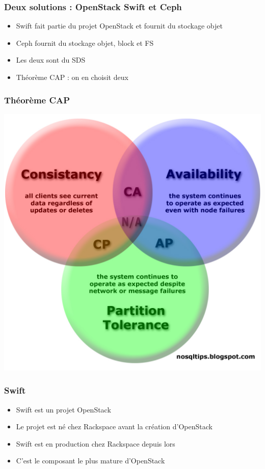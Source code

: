   \begin{frame}
    \frametitle{Deux solutions : OpenStack Swift et Ceph}
    \begin{itemize}
      \item Swift fait partie du projet OpenStack et fournit du stockage objet
      \item Ceph fournit du stockage objet, block et FS
      \item Les deux sont du SDS
      \item Théorème CAP : on en choisit deux
    \end{itemize}
  \end{frame}

  \begin{frame}
  \frametitle{Théorème CAP}
  \includegraphics[width=\textwidth,height=\textheight]{images/cap.jpg}
  \end{frame}

  \begin{frame}
  \frametitle{Swift}
    \begin{itemize}
      \item Swift est un projet OpenStack
      \item Le projet est né chez Rackspace avant la création d'OpenStack
      \item Swift est en production chez Rackspace depuis lors
      \item C'est le composant le plus mature d'OpenStack
    \end{itemize}
  \end{frame}

